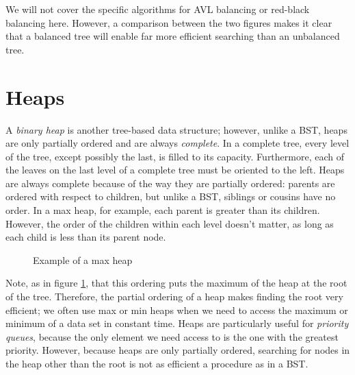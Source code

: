 We will not cover the specific algorithms for AVL balancing or red-black balancing here.
However, a comparison between the two figures makes it clear that a balanced tree will enable far more efficient searching than an unbalanced tree.

\section*{Heaps}
A \emph{binary heap} is another tree-based data structure; however, unlike a BST, heaps are only partially ordered and are always \emph{complete}.
In a complete tree, every level of the tree, except possibly the last, is filled to its capacity.
Furthermore, each of the leaves on the last level of a complete tree must be oriented to the left.
Heaps are always complete because of the way they are partially ordered: parents are ordered with respect to children, but unlike a BST, siblings or cousins have no order.
In a max heap, for example, each parent is greater than its children.
However, the order of the children within each level doesn't matter, as long as each child is less than its parent node.
\begin{figure}
\begin{centering}
\end{centering}
\caption{Example of a max heap}
\label{fig:Max Heap}
\end{figure}
Note, as in figure \ref{fig:Max Heap}, that this ordering puts the maximum of the heap at the root of the tree.
Therefore, the partial ordering of a heap makes finding the root very efficient; we often use max or min heaps when we need to access the maximum or minimum of a data set in constant time.
Heaps are particularly useful for \emph{priority queues}, because the only element we need access to is the one with the greatest priority.
However, because heaps are only partially ordered, searching for nodes in the heap other than the root is not as efficient a procedure as in a BST.

